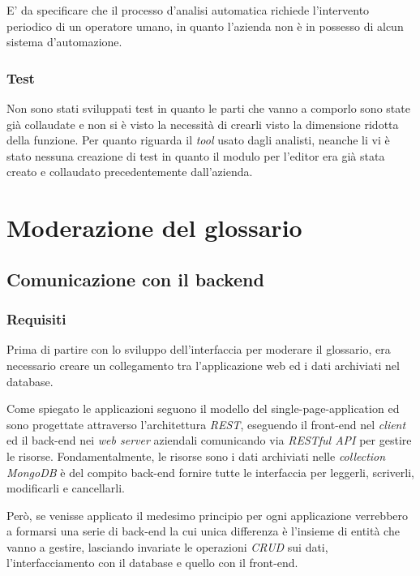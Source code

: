 E' da specificare che il processo d'analisi automatica richiede l'intervento
periodico di un operatore umano, in quanto l'azienda non è in possesso di alcun
sistema d'automazione.

\subsubsection{Test}
Non sono stati sviluppati test in quanto le parti che vanno a comporlo sono
state già collaudate e non si è visto la necessità di crearli visto la
dimensione ridotta della funzione. Per quanto riguarda il \textit{tool} usato
dagli analisti, neanche li vi è stato nessuna creazione di test in quanto il
modulo per l'editor era già stata creato e collaudato precedentemente
dall'azienda.
%

\section{Moderazione del glossario}
\label{sec:glossary}
\subsection{Comunicazione con il backend}
\subsubsection{Requisiti}
Prima di partire con lo sviluppo dell'interfaccia per moderare il glossario, era
necessario creare un collegamento tra l'applicazione web ed i dati archiviati
nel database.

Come spiegato le applicazioni seguono il modello del
\gls{single-page-application} ed sono progettate attraverso l'architettura
\textit{REST}, eseguendo il \gls{front-end} nel \textit{client} ed il
\gls{back-end} nei \textit{web server} aziendali comunicando via
\textit{RESTful API} per gestire le risorse. Fondamentalmente, le risorse sono i
dati archiviati nelle \textit{collection MongoDB} è del compito \gls{back-end}
fornire tutte le interfaccia per leggerli, scriverli, modificarli e cancellarli.

Però, se venisse applicato il medesimo principio per ogni applicazione
verrebbero a formarsi una serie di \gls{back-end} la cui unica differenza è
l'insieme di entità che vanno a gestire, lasciando invariate le operazioni
\textit{CRUD} sui dati, l'interfacciamento con il database e quello con il
\gls{front-end}.

